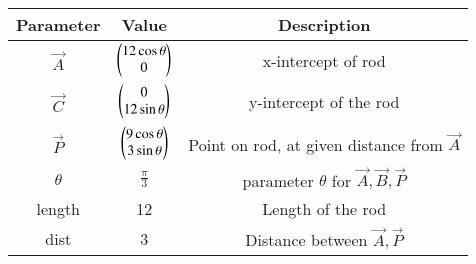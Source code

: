 
\begin{tabular}[]{|c|c|c|}
\hline
Parameter	& Value	& Description \\ \hline
$\vec{A}$	& $\begin{pmatrix}12 \cos{\theta}\\0\end{pmatrix}$ & x-intercept of rod \\ \hline
$\vec{C}$	& $\begin{pmatrix}0\\ 12 \sin{\theta}\end{pmatrix}$ & y-intercept of the rod\\ \hline
$\vec{P}$	& $\begin{pmatrix}9 \cos{\theta} \\ 3\sin{\theta}\end{pmatrix}  $ & Point on rod, at given distance from $\vec{A} $ \\ \hline
$\theta$ 		& $\frac{\pi}{3}$ & parameter $\theta$ for $\vec{A}, \vec{B},\vec{P}$\\[1pt] \hline
length	& 12 	& Length of the rod \\ \hline
dist	& 3	& Distance between $\vec{A}, \vec{P}$\\ \hline
\end{tabular}

